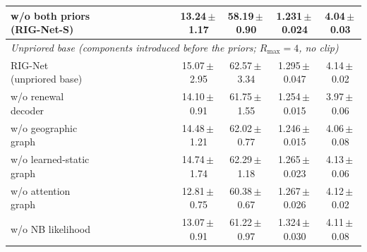 \documentclass[conference]{IEEEtran}
\newcommand{\cmark}{\textcolor{green!45!black}{\ding{51}}}
\newcommand{\xmark}{\textcolor{red!70!black}{\ding{55}}}
\begin{document}
\begin{table}[t]
{\begin{tabular}{lcccccccc cccc}
w/o both priors (RIG-Net-S) & \cmark & \cmark & \cmark & \cmark & \cmark & \xmark & \xmark & \xmark & 13.24\,$\pm$\,1.17 & 58.19\,$\pm$\,0.90 & 1.231\,$\pm$\,0.024 & 4.04\,$\pm$\,0.03 \\
\hline
\multicolumn{13}{l}{\emph{Unpriored base (components introduced before the priors; $R_{\max}{=}4$, no clip)}}\\
\hline
RIG-Net (unpriored base) & \cmark & \xmark & \cmark & \cmark & \cmark & \xmark & \xmark & \xmark & 15.07\,$\pm$\,2.95 & 62.57\,$\pm$\,3.34 & 1.295\,$\pm$\,0.047 & 4.14\,$\pm$\,0.02 \\
\quad w/o renewal decoder & \xmark & \xmark & \cmark & \cmark & \cmark & \xmark & \xmark & \xmark & 14.10\,$\pm$\,0.91 & 61.75\,$\pm$\,1.55 & 1.254\,$\pm$\,0.015 & 3.97\,$\pm$\,0.06 \\
\quad w/o geographic graph & \cmark & \xmark & \xmark & \cmark & \cmark & \xmark & \xmark & \xmark & 14.48\,$\pm$\,1.21 & 62.02\,$\pm$\,0.77 & 1.246\,$\pm$\,0.015 & 4.06\,$\pm$\,0.08 \\
\quad w/o learned-static graph & \cmark & \xmark & \cmark & \xmark & \cmark & \xmark & \xmark & \xmark & 14.74\,$\pm$\,1.74 & 62.29\,$\pm$\,1.18 & 1.265\,$\pm$\,0.023 & 4.13\,$\pm$\,0.06 \\
\quad w/o attention graph & \cmark & \xmark & \cmark & \cmark & \xmark & \xmark & \xmark & \xmark & 12.81\,$\pm$\,0.75 & 60.38\,$\pm$\,0.67 & 1.267\,$\pm$\,0.026 & 4.12\,$\pm$\,0.02 \\
\quad w/o NB likelihood & \cmark & \xmark & \cmark & \cmark & \cmark & \xmark & \xmark & \xmark & 13.07\,$\pm$\,0.91 & 61.22\,$\pm$\,0.97 & 1.324\,$\pm$\,0.030 & 4.11\,$\pm$\,0.08 \\
\hline
\end{tabular}%
}
\end{table}
\end{document}
